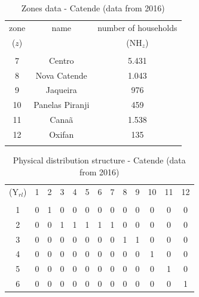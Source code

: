 \documentclass{singlecol}
\theoremstyle{TH}{
\newtheorem{lemma}{Lemma}
\newtheorem{theorem}[lemma]{Theorem}
\newtheorem{corrolary}[lemma]{Corrolary}
\newtheorem{conjecture}[lemma]{Conjecture}
\newtheorem{proposition}[lemma]{Proposition}
\newtheorem{claim}[lemma]{Claim}
\newtheorem{stheorem}[lemma]{Wrong Theorem}
\newtheorem{algorithm}{Algorithm}
}
\theoremstyle{THrm}{
\newtheorem{definition}{Definition}[section]
\newtheorem{question}{Question}[section]
\newtheorem{remark}{Remark}
\newtheorem{scheme}{Scheme}
}
\theoremstyle{THhit}{
\newtheorem{case}{Case}[section]
}
\begin{document}
\begin{table}[H]
\begin{center}
	\begin{tabular}{ c  c  c } 
		zone          & name         & number of households \\
		($z$)          &              & ($\mathrm{NH}_{z}$)   \\
		                                               \\
		7              & Centro           & 5.431 \\
		8              & Nova Catende     & 1.043 \\
		9              & Jaqueira         &   976 \\
	   10              & Panelas Piranji  &   459 \\
	   11              & Canaã            & 1.538 \\
	   12              & Oxifan           &   135 \\
	   \\
	\end{tabular}
\caption{Zones data - Catende (data from 2016)}
\label{tab:zonesCatende}
\end{center}
\end{table}

\begin{table}[H]
\begin{center}
	\begin{tabular}{ c c c c c c c c c c c c c } 

		($\mathrm{Y}_{rl}$)	& 1 & 2 & 3 & 4 & 5 & 6 & 7 & 8 & 9 & 10 & 11 & 12  \\
		                                                                      \\
		1	              	& 0 & 1 & 0 & 0 & 0 & 0 & 0 & 0 & 0 &  0 &  0 &  0  \\
		2                 	& 0 & 0 & 1 & 1 & 1 & 1 & 1 & 0 & 0 &  0 &  0 &  0  \\
		3                 	& 0 & 0 & 0 & 0 & 0 & 0 & 0 & 1 & 1 &  0 &  0 &  0  \\
		4                 	& 0 & 0 & 0 & 0 & 0 & 0 & 0 & 0 & 0 &  1 &  0 &  0  \\
		5                 	& 0 & 0 & 0 & 0 & 0 & 0 & 0 & 0 & 0 &  0 &  1 &  0  \\
	    6                 	& 0 & 0 & 0 & 0 & 0 & 0 & 0 & 0 & 0 &  0 &  0 &  1  \\
	\end{tabular}
\caption{Physical distribution structure - Catende (data from 2016)}
\label{tab:phyDitStr}
\end{center}
\end{table}
\end{document}
